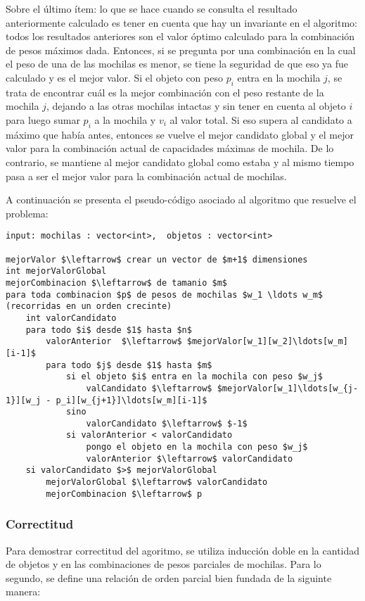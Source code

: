 Sobre el último ítem: lo que se hace cuando se consulta el resultado anteriormente calculado es tener en cuenta que hay un invariante en el algoritmo: todos los resultados anteriores son el valor óptimo calculado para la combinación de pesos máximos dada. Entonces, si se pregunta por una combinación en la cual el peso de una de las mochilas es menor, se tiene la seguridad de que eso ya fue calculado y es el mejor valor. Si el objeto con peso $p_i$ entra en la mochila $j$, se trata de encontrar cuál es la mejor combinación con el peso restante de la mochila $j$, dejando a las otras mochilas intactas y sin tener en cuenta al objeto $i$ para luego sumar $p_i$ a la mochila y $v_i$ al valor total. Si eso supera al candidato a máximo que había antes, entonces se vuelve el mejor candidato global y el mejor valor para la combinación actual de capacidades máximas de mochila. De lo contrario, se mantiene al mejor candidato global como estaba y al mismo tiempo pasa a ser el mejor valor para la combinación actual de mochilas.

A continuación se presenta el pseudo-código asociado al algoritmo que resuelve el problema:

\lstset{basicstyle=\large}
\begin{lstlisting}
input: mochilas : vector<int>,  objetos : vector<int>

mejorValor $\leftarrow$ crear un vector de $m+1$ dimensiones
int mejorValorGlobal
mejorCombinacion $\leftarrow$ de tamanio $m$
para toda combinacion $p$ de pesos de mochilas $w_1 \ldots w_m$ (recorridas en un orden crecinte)
	int valorCandidato
	para todo $i$ desde $1$ hasta $n$
		valorAnterior  $\leftarrow$ $mejorValor[w_1][w_2]\ldots[w_m][i-1]$
		para todo $j$ desde $1$ hasta $m$
			si el objeto $i$ entra en la mochila con peso $w_j$
				valCandidato $\leftarrow$ $mejorValor[w_1]\ldots[w_{j-1}][w_j - p_i][w_{j+1}]\ldots[w_m][i-1]$
			sino
				valorCandidato $\leftarrow$ $-1$
			si valorAnterior < valorCandidato
				pongo el objeto en la mochila con peso $w_j$
				valorAnterior $\leftarrow$ valorCandidato
	si valorCandidato $>$ mejorValorGlobal
		mejorValorGlobal $\leftarrow$ valorCandidato
		mejorCombinacion $\leftarrow$ p

\end{lstlisting}

\subsubsection{Correctitud}

Para demostrar correctitud del agoritmo, se utiliza inducción doble en la cantidad de objetos y en las combinaciones de pesos parciales de mochilas. Para lo segundo, se define una relación de orden parcial bien fundada de la siguinte manera:

